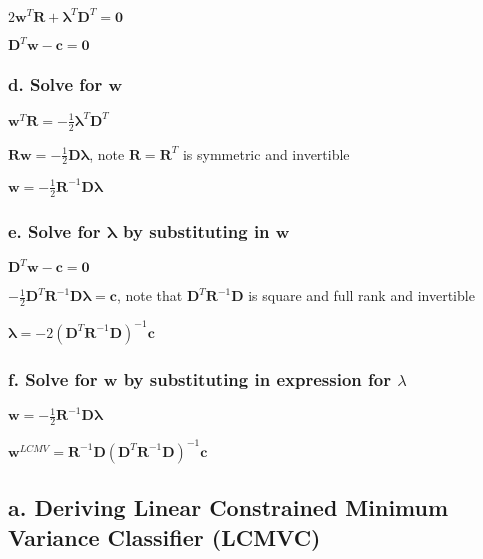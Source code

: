 \documentclass[paper=a4, fontsize=11pt]{scrartcl} %
\numberwithin{equation}{section} %
\numberwithin{figure}{section} %
\numberwithin{table}{section} %
\begin{document}
\vspace{2mm}

\(
2 \bm{w}^T\bm{R} + \bm{\lambda}^T\bm{D}^T = \bm{0}
\)

\vspace{2mm}

\(
\bm{D}^T\bm{w} - \bm{c} = \bm{0}
\)

\subsubsection*{d. Solve for \(\bm{w}\)}
\(
\bm{w}^T\bm{R} = -\frac{1}{2}\bm{\lambda}^T\bm{D}^T
\)

\vspace{2mm}

\(
\bm{R} \bm{w} = -\frac{1}{2} \bm{D} \bm{\lambda}
\), note \(\bm{R} = \bm{R}^T\) is symmetric and invertible

\vspace{2mm}

\(
\bm{w} = -\frac{1}{2}\bm{R}^{-1}\bm{D}\bm{\lambda}
\)

\subsubsection*{e. Solve for \(\bm{\lambda}\) by substituting in \(\bm{w}\)}

\(
\bm{D}^T\bm{w} - \bm{c} = \bm{0}
\)

\vspace{2mm}

\(
-\frac{1}{2} \bm{D}^T\bm{R}^{-1}\bm{D}\bm{\lambda} = \bm{c}
\), note that \(\bm{D}^T\bm{R}^{-1}\bm{D}\) is square and full rank and invertible

\vspace{2mm}

\(
\bm{\lambda}  = -2(\bm{D}^T\bm{R}^{-1}\bm{D})^{-1}\bm{c}
\)

\subsubsection*{f. Solve for \(\bm{w}\) by substituting in expression for \(\lambda\)}
\(
\bm{w} = -\frac{1}{2}\bm{R}^{-1}\bm{D}\bm{\lambda}
\)

\vspace{2mm}

\(
\bm{w}^{LCMV} = \bm{R}^{-1}\bm{D}(\bm{D}^T\bm{R}^{-1}\bm{D})^{-1}\bm{c}
\)


\pagebreak
\subsection*{a. Deriving Linear Constrained Minimum Variance Classifier (LCMVC)}
\end{document}
